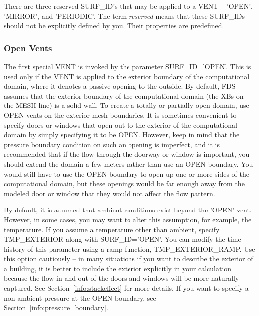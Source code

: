 \documentclass[11pt]{book}
\begin{document}
\label{info:Special_VENTS}

There are three reserved {\ct SURF\_ID}'s that may be applied to a {\ct VENT} -- {\ct 'OPEN'}, {\ct 'MIRROR'}, and {\ct 'PERIODIC'}. The term {\em reserved} means that these {\ct SURF\_ID}s should not be explicitly defined by you. Their properties are predefined.

\subsubsection{Open Vents}

The first special {\ct VENT} is invoked by the parameter {\ct SURF\_ID='OPEN'}. This is used only if the {\ct VENT} is applied to the exterior boundary of the computational domain, where it denotes a passive opening to the outside. By default, FDS assumes that the exterior boundary of the computational domain (the {\ct XB}s on the {\ct MESH} line) is a solid wall. To create a totally or partially open domain, use {\ct OPEN} vents on the exterior mesh boundaries. It is sometimes convenient to specify doors or windows that open out to the exterior of the computational domain by simply specifying it to be {\ct OPEN}. However, keep in mind that the pressure boundary condition on such an opening is imperfect, and it is recommended that if the flow through the doorway or window is important, you should extend the domain a few meters rather than use an {\ct OPEN} boundary. You would still have to use the {\ct OPEN} boundary to open up one or more sides of the computational domain, but these openings would be far enough away from the modeled door or window that they would not affect the flow pattern.

By default, it is assumed that ambient conditions exist beyond the {\ct 'OPEN'} vent. However, in some cases, you may want to alter this assumption, for example, the temperature. If you assume a temperature other than ambient, specify {\ct TMP\_EXTERIOR} along with {\ct SURF\_ID='OPEN'}. You can modify the time history of this parameter using a ramp function, {\ct TMP\_EXTERIOR\_RAMP}. Use this option cautiously -- in many situations if you want to describe the exterior of a building, it is better to include the exterior explicitly in your calculation because the flow in and out of the doors and windows will be more naturally captured. See Section~\ref{info:stackeffect} for more details. If you want to specify a non-ambient pressure at the {\ct OPEN} boundary, see Section~\ref{info:pressure_boundary}.
\end{document}
